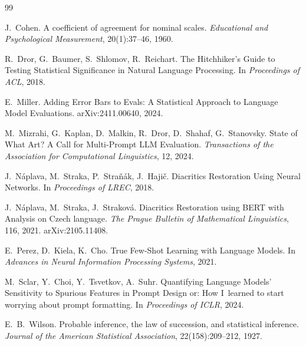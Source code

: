 \documentclass[11pt,a4paper]{article}
\begin{document}
\begin{thebibliography}{99}

J.~Cohen. A coefficient of agreement for nominal scales.
\emph{Educational and Psychological Measurement}, 20(1):37--46, 1960.

R.~Dror, G.~Baumer, S.~Shlomov, R.~Reichart. The Hitchhiker's Guide to
Testing Statistical Significance in Natural Language Processing.
In \emph{Proceedings of ACL}, 2018.

E.~Miller. Adding Error Bars to Evals: A Statistical Approach to
Language Model Evaluations. arXiv:2411.00640, 2024.

M.~Mizrahi, G.~Kaplan, D.~Malkin, R.~Dror, D.~Shahaf, G.~Stanovsky.
State of What Art? A Call for Multi-Prompt LLM Evaluation.
\emph{Transactions of the Association for Computational Linguistics},
12, 2024.

J.~Náplava, M.~Straka, P.~Straňák, J.~Hajič. Diacritics Restoration
Using Neural Networks. In \emph{Proceedings of LREC}, 2018.

J.~Náplava, M.~Straka, J.~Straková. Diacritics Restoration using BERT
with Analysis on Czech language. \emph{The Prague Bulletin of
Mathematical Linguistics}, 116, 2021. arXiv:2105.11408.

E.~Perez, D.~Kiela, K.~Cho. True Few-Shot Learning with Language Models.
In \emph{Advances in Neural Information Processing Systems}, 2021.

M.~Sclar, Y.~Choi, Y.~Tsvetkov, A.~Suhr. Quantifying Language Models'
Sensitivity to Spurious Features in Prompt Design or: How I~learned to
start worrying about prompt formatting. In \emph{Proceedings of ICLR},
2024.

E.~B.~Wilson. Probable inference, the law of succession, and statistical
inference. \emph{Journal of the American Statistical Association},
22(158):209--212, 1927.

\end{thebibliography}
\end{document}
